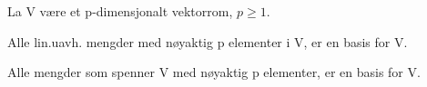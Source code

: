 La V være et p-dimensjonalt vektorrom, $p\geq 1$.

Alle lin.uavh. mengder med nøyaktig p elementer i V, er en basis for V.

Alle mengder som spenner V med nøyaktig p elementer, er en basis for V.
